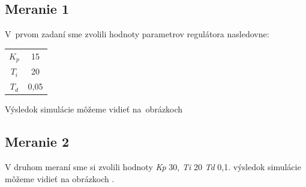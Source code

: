\documentclass{article}
\begin{document}
\subsection{Meranie 1}
\label{sec:meranie1}

V~prvom zadaní sme zvolili hodnoty parametrov regulátora nasledovne:

\begin{center}
\begin{tabular}{ |c|c| }
 \hline
 $K_p$ & 15 \\
 $T_i$ & 20 \\
 $T_d$ & 0,05 \\
 \hline
\end{tabular}
\end{center}

Výsledok simulácie môžeme vidieť na~obrázkoch


\clearpage


\subsection{Meranie 2}
\label{sec:meranie2}

V druhom meraní sme si zvolili hodnoty \textit{Kp} 30, \textit{Ti} 20 \textit{Td} 0,1. výsledok simulácie môžeme vidieť na obrázkoch  .

\clearpage


\end{document}
